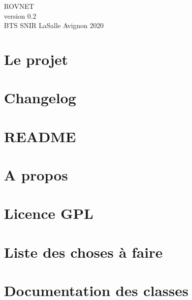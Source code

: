 \documentclass[twoside]{article}
\newcommand{\+}{\discretionary{\mbox{\scriptsize$\hookleftarrow$}}{}{}}
\begin{document}
\hypersetup{pageanchor=false,
             bookmarksnumbered=true,
             pdfencoding=unicode
            }
\begin{titlepage}
\vspace*{7cm}

\begin{center}%
{\LARGE R\+O\+V\textquotesingle{}\+N\+ET}\\
\vspace*{1cm}
{\large version 0.\+2}\\
\vspace*{1cm}
{\large B\+T\+S S\+N\+I\+R La\+Salle Avignon 2020}\\
\end{center}
\end{titlepage}
\tableofcontents
{}
\hypersetup{pageanchor=true}

\section{Le projet}
\label{index}\hypertarget{index}{}
\section{Changelog}
\label{page_changelog}

\section{R\+E\+A\+D\+ME}
\label{page__r_e_a_d_m_e}

\section{A propos}
\label{page_about}

\section{Licence G\+PL}
\label{page_licence}

\section{Liste des choses à faire}
\label{todo}

\section{Documentation des classes}
























\end{document}
